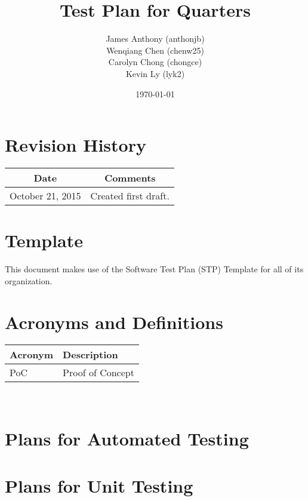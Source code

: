 \documentclass[12pt]{article}
\begin{document}
\title{Test Plan for Quarters} 
\author{James Anthony (anthonjb)\\ Wenqiang Chen (chenw25)\\ Carolyn Chong 
(chongce)\\ Kevin Ly (lyk2)}
\date{\today}
  
\maketitle

\pagebreak

\tableofcontents

\section*{Revision History}
\begin{tabular}{|c|c|}
\hline
\textbf{Date}  & \textbf{Comments} \\ \hline
October 21, 2015 & Created first draft. \\ 
\hline
\end{tabular}

\section*{Template}
This document makes use of the Software Test Plan (STP) Template for all of its organization.

\pagebreak


\section{Acronyms and Definitions}
\renewcommand{\arraystretch}{1.2}
\begin{tabular}{l l} 
  \toprule    
  \textbf{Acronym} & \textbf{Description}\\
  \midrule 
  PoC   &Proof of Concept\\
  \bottomrule
\end{tabular}\\


\section{Plans for Automated Testing}


\section{Plans for Unit Testing}
\end{document}
